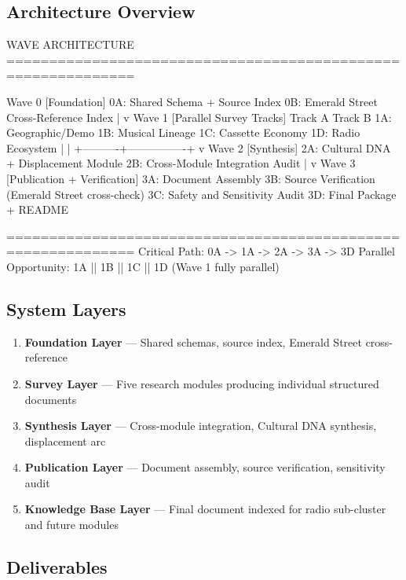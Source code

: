 \documentclass[11pt,letterpaper]{article}
\begin{document}
\subsection{Architecture Overview}

\begin{asciibox}
WAVE ARCHITECTURE
=============================================================

Wave 0  [Foundation]
   0A: Shared Schema + Source Index
   0B: Emerald Street Cross-Reference Index
         |
         v
Wave 1  [Parallel Survey Tracks]
   Track A                    Track B
   1A: Geographic/Demo         1B: Musical Lineage
   1C: Cassette Economy        1D: Radio Ecosystem
         |                           |
         +----------+----------------+
                    v
Wave 2  [Synthesis]
   2A: Cultural DNA + Displacement Module
   2B: Cross-Module Integration Audit
                    |
                    v
Wave 3  [Publication + Verification]
   3A: Document Assembly
   3B: Source Verification (Emerald Street cross-check)
   3C: Safety and Sensitivity Audit
   3D: Final Package + README

=============================================================
Critical Path: 0A -> 1A -> 2A -> 3A -> 3D
Parallel Opportunity: 1A || 1B || 1C || 1D (Wave 1 fully parallel)
\end{asciibox}

\subsection{System Layers}

\begin{enumerate}
  \item \textbf{Foundation Layer} --- Shared schemas, source index, Emerald Street cross-reference
  \item \textbf{Survey Layer} --- Five research modules producing individual structured documents
  \item \textbf{Synthesis Layer} --- Cross-module integration, Cultural DNA synthesis, displacement arc
  \item \textbf{Publication Layer} --- Document assembly, source verification, sensitivity audit
  \item \textbf{Knowledge Base Layer} --- Final document indexed for radio sub-cluster and future modules
\end{enumerate}

\subsection{Deliverables}
\end{document}
